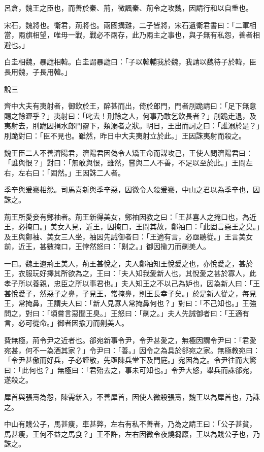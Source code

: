 \begin{pinyinscope}
呂倉，魏王之臣也，而善於秦、荊，微諷秦、荊令之攻魏，因請行和以自重也。

宋石，魏將也。衛君，荊將也。兩國搆難，二子皆將，宋石遺衛君書曰：「二軍相當，兩旗相望，唯毋一戰，戰必不兩存，此乃兩主之事也，與子無有私怨，善者相避也。」

白圭相魏，暴譴相韓。白圭謂暴譴曰：「子以韓輔我於魏，我請以魏待子於韓，臣長用魏，子長用韓。」

說三

齊中大夫有夷射者，御飲於王，醉甚而出，倚於郎門，門者刖跪請曰：「足下無意賜之餘瀝乎？」夷射曰：「叱去！刑餘之人，何事乃敢乞飲長者？」刖跪走退，及夷射去，刖跪因捐水郎門霤下，類溺者之狀。明日，王出而訶之曰：「誰溺於是？」刖跪對曰：「臣不見也。雖然，昨日中大夫夷射立於此。」王因誅夷射而殺之。

魏王臣二人不善濟陽君，濟陽君因偽令人矯王命而謀攻己，王使人問濟陽君曰：「誰與恨？」對曰：「無敢與恨，雖然，嘗與二人不善，不足以至於此。」王問左右，左右曰：「固然。」王因誅二人者。

季辛與爰騫相怨。司馬喜新與季辛惡，因微令人殺爰騫，中山之君以為季辛也，因誅之。

荊王所愛妾有鄭袖者。荊王新得美女，鄭袖因教之曰：「王甚喜人之掩口也，為近王，必掩口。」美女入見，近王，因掩口，王問其故，鄭袖曰：「此固言惡王之臭。」及王與鄭袖、美女三人坐，袖因先誡御者曰：「王適有言，必亟聽從。」王言美女前，近王，甚數掩口，王悖然怒曰：「劓之。」御因揄刀而劓美人。

一曰。魏王遺荊王美人，荊王甚悅之，夫人鄭袖知王悅愛之也，亦悅愛之，甚於王，衣服玩好擇其所欲為之，王曰：「夫人知我愛新人也，其悅愛之甚於寡人，此孝子所以養親，忠臣之所以事君也。」夫人知王之不以己為妒也，因為新人曰：「王甚悅愛子，然惡子之鼻，子見王，常掩鼻，則王長幸子矣。」於是新人從之，每見王，常掩鼻，王謂夫人曰：「新人見寡人常掩鼻何也？」對曰：「不己知也。」王強問之，對曰：「頃嘗言惡聞王臭。」王怒曰：「劓之。」夫人先誡御者曰：「王適有言，必可從命。」御者因揄刀而劓美人。

費無極，荊令尹之近者也。郤宛新事令尹，令尹甚愛之，無極因謂令尹曰：「君愛宛甚，何不一為酒其家？」令尹曰：「善。」因令之為具於郤宛之家。無極教宛曰：「令尹甚傲而好兵，子必謹敬，先亟陳兵堂下及門庭。」宛因為之。令尹往而大驚曰：「此何也？」無極曰：「君殆去之，事未可知也。」令尹大怒，舉兵而誅郤宛，遂殺之。

犀首與張壽為怨，陳需新入，不善犀首，因使人微殺張壽，魏王以為犀首也，乃誅之。

中山有賤公子，馬甚瘦，車甚弊，左右有私不善者，乃為之請王曰：「公子甚貧，馬甚瘦，王何不益之馬食？」王不許，左右因微令夜燒芻廄，王以為賤公子也，乃誅之。


\end{pinyinscope}
